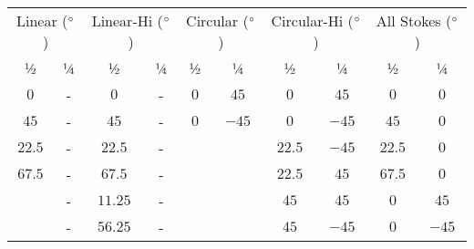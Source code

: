 \begin{table}[t]
    \centering
    \begin{tabular}{cccccccccc}
        \hline
        \multicolumn{2}{c}{Linear ($\hbox{$^\circ$}$)} & \multicolumn{2}{c}{Linear-Hi ($\hbox{$^\circ$}$)} & \multicolumn{2}{c}{Circular ($\hbox{$^\circ$}$)} & \multicolumn{2}{c}{Circular-Hi ($\hbox{$^\circ$}$)} & \multicolumn{2}{c}{All Stokes ($\hbox{$^\circ$}$)}                                                 \\
        ½                                    & ¼                                       & ½                                      & ¼                                         & ½                                        & ¼       & ½      & ¼       & ½      & ¼       \\ \hline
        $0$                                  & -                                       & $0$                                    & -                                         & $0$                                      & ${ }45$ & $0$    & ${ }45$ & $0$    & $0$     \\
        $45$                                 & -                                       & $45$                                   & -                                         & $0$                                      & $-45$   & $0$    & $-45$   & $45$   & $0$     \\
        $22.5$                               & -                                       & $22.5$                                 & -                                         &                                          &         & $22.5$ & $-45$   & $22.5$ & $0$     \\
        $67.5$                               & -                                       & $67.5$                                 & -                                         &                                          &         & $22.5$ & ${ }45$ & $67.5$ & $0$     \\
                                             & -                                       & $11.25$                                & -                                         &                                          &         & $45$   & ${ }45$ & $0$    & ${ }45$ \\
                                             & -                                       & $56.25$                                & -                                         &                                          &         & $45$   & $-45$   & $0$    & $-45$   \\

\end{tabular}
\end{table}
